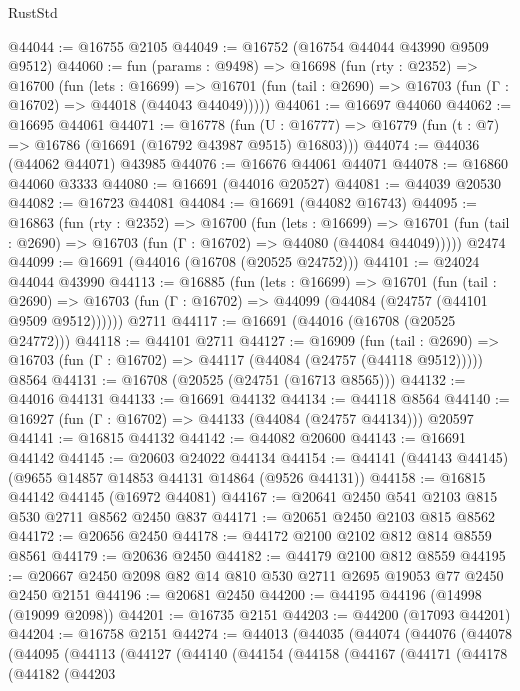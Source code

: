 \begin{lexlean}{RustStd}
\begin{coremodule}
@44044 := @16755 @2105
@44049 := @16752 (@16754 @44044 @43990 @9509 @9512)
@44060 := fun (params : @9498) =>
  @16698
    (fun (rty : @2352) =>
    @16700
      (fun (lets : @16699) =>
      @16701 (fun (tail : @2690) => @16703 (fun (Γ : @16702) => @44018 (@44043 @44049)))))
@44061 := @16697 @44060
@44062 := @16695 @44061
@44071 := @16778
    (fun (U : @16777) => @16779 (fun (t : @7) => @16786 (@16691 (@16792 @43987 @9515) @16803)))
@44074 := @44036 (@44062 @44071) @43985
@44076 := @16676 @44061 @44071
@44078 := @16860 @44060 @3333
@44080 := @16691 (@44016 @20527)
@44081 := @44039 @20530
@44082 := @16723 @44081
@44084 := @16691 (@44082 @16743)
@44095 := @16863
    (fun (rty : @2352) =>
    @16700
      (fun (lets : @16699) =>
      @16701 (fun (tail : @2690) => @16703 (fun (Γ : @16702) => @44080 (@44084 @44049)))))
    @2474
@44099 := @16691 (@44016 (@16708 (@20525 @24752)))
@44101 := @24024 @44044 @43990
@44113 := @16885
    (fun (lets : @16699) =>
    @16701
      (fun (tail : @2690) =>
      @16703 (fun (Γ : @16702) => @44099 (@44084 (@24757 (@44101 @9509 @9512))))))
    @2711
@44117 := @16691 (@44016 (@16708 (@20525 @24772)))
@44118 := @44101 @2711
@44127 := @16909
    (fun (tail : @2690) => @16703 (fun (Γ : @16702) => @44117 (@44084 (@24757 (@44118 @9512)))))
    @8564
@44131 := @16708 (@20525 (@24751 (@16713 @8565)))
@44132 := @44016 @44131
@44133 := @16691 @44132
@44134 := @44118 @8564
@44140 := @16927 (fun (Γ : @16702) => @44133 (@44084 (@24757 @44134))) @20597
@44141 := @16815 @44132
@44142 := @44082 @20600
@44143 := @16691 @44142
@44145 := @20603 @24022 @44134
@44154 := @44141 (@44143 @44145) (@9655 @14857 @14853 @44131 @14864 (@9526 @44131))
@44158 := @16815 @44142 @44145 (@16972 @44081)
@44167 := @20641 @2450 @541 @2103 @815 @530 @2711 @8562 @2450 @837
@44171 := @20651 @2450 @2103 @815 @8562
@44172 := @20656 @2450
@44178 := @44172 @2100 @2102 @812 @814 @8559 @8561
@44179 := @20636 @2450
@44182 := @44179 @2100 @812 @8559
@44195 := @20667 @2450 @2098 @82 @14 @810 @530 @2711 @2695 @19053 @77 @2450 @2450 @2151
@44196 := @20681 @2450
@44200 := @44195 @44196 (@14998 (@19099 @2098))
@44201 := @16735 @2151
@44203 := @44200 (@17093 @44201)
@44204 := @16758 @2151
@44274 := @44013
    (@44035
      (@44074
        (@44076
          (@44078
            (@44095
              (@44113
                (@44127
                  (@44140
                    (@44154
                      (@44158
                        (@44167
                          (@44171
                            (@44178
                              (@44182
                                (@44203

\end{coremodule}
\end{lexlean}
